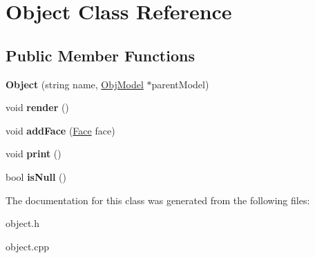 \hypertarget{classObject}{\section{Object Class Reference}
\label{classObject}
}
\subsection*{Public Member Functions}
\begin{DoxyCompactItemize}
\item 
\hypertarget{classObject_a536bd18bd32a3abae15cffd38e8f7861}{{\bfseries Object} (string name, \hyperlink{classObjModel}{Obj\-Model} $\ast$parent\-Model)}\label{classObject_a536bd18bd32a3abae15cffd38e8f7861}

\item 
\hypertarget{classObject_ae0e92359520b9a848f45efdd86485552}{void {\bfseries render} ()}\label{classObject_ae0e92359520b9a848f45efdd86485552}

\item 
\hypertarget{classObject_aea93aef61f2e464ccf297ea2be914e9a}{void {\bfseries add\-Face} (\hyperlink{classFace}{Face} face)}\label{classObject_aea93aef61f2e464ccf297ea2be914e9a}

\item 
\hypertarget{classObject_a9c5b41f17b960452065d2e6675655af0}{void {\bfseries print} ()}\label{classObject_a9c5b41f17b960452065d2e6675655af0}

\item 
\hypertarget{classObject_a5581cddd8e15ff480cc60f0e2715eecb}{bool {\bfseries is\-Null} ()}\label{classObject_a5581cddd8e15ff480cc60f0e2715eecb}

\end{DoxyCompactItemize}


The documentation for this class was generated from the following files\-:\begin{DoxyCompactItemize}
\item 
object.\-h\item 
object.\-cpp\end{DoxyCompactItemize}

